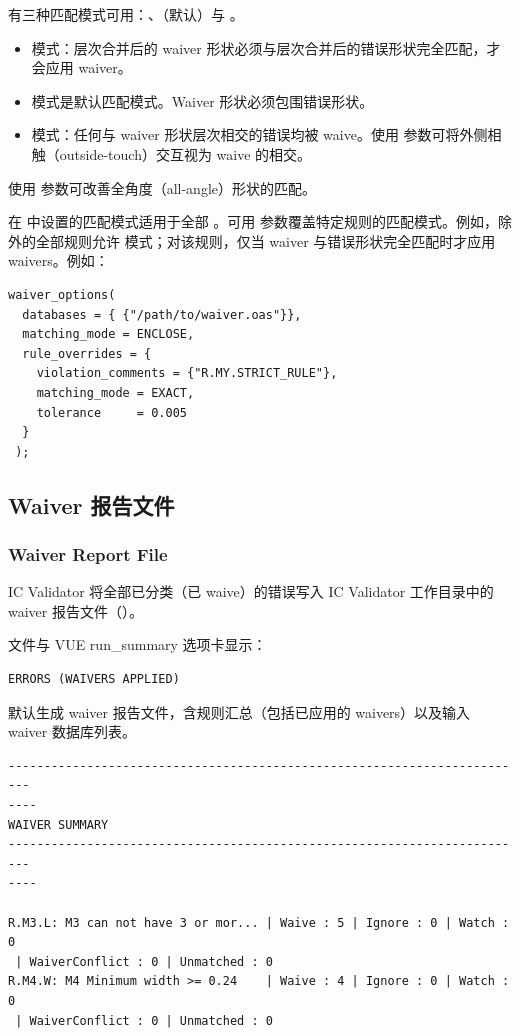有三种匹配模式可用：、（默认）与 。
\begin{itemize}
  \item {} 模式：层次合并后的 waiver 形状必须与层次合并后的错误形状完全匹配，才会应用 waiver。
  \item {} 模式是默认匹配模式。Waiver 形状必须包围错误形状。
  \item {} 模式：任何与 waiver 形状层次相交的错误均被 waive。使用  参数可将外侧相触（outside-touch）交互视为 waive 的相交。
\end{itemize}

\begin{noteBox}
使用  参数可改善全角度（all-angle）形状的匹配。
\end{noteBox}

在  中设置的匹配模式适用于全部 。可用  参数覆盖特定规则的匹配模式。例如，除  外的全部规则允许  模式；对该规则，仅当 waiver 与错误形状完全匹配时才应用 waivers。例如：
\begin{lstlisting}[style=pxl]
waiver_options(
  databases = { {"/path/to/waiver.oas"}},
  matching_mode = ENCLOSE,
  rule_overrides = {
    violation_comments = {"R.MY.STRICT_RULE"},
    matching_mode = EXACT,
    tolerance     = 0.005
  }
 );
\end{lstlisting}

\subsection{Waiver 报告文件}
\subsubsection*{Waiver Report File}

IC Validator 将全部已分类（已 waive）的错误写入 IC Validator 工作目录中的 waiver 报告文件（）。

 文件与 VUE run\_summary 选项卡显示：
\begin{lstlisting}[style=shell]
ERRORS (WAIVERS APPLIED)
\end{lstlisting}

默认生成 waiver 报告文件，含规则汇总（包括已应用的 waivers）以及输入 waiver 数据库列表。
\begin{lstlisting}[style=shell]
-------------------------------------------------------------------------
----
WAIVER SUMMARY
-------------------------------------------------------------------------
----

R.M3.L: M3 can not have 3 or mor... | Waive : 5 | Ignore : 0 | Watch : 0
 | WaiverConflict : 0 | Unmatched : 0
R.M4.W: M4 Minimum width >= 0.24    | Waive : 4 | Ignore : 0 | Watch : 0
 | WaiverConflict : 0 | Unmatched : 0
\end{lstlisting}

